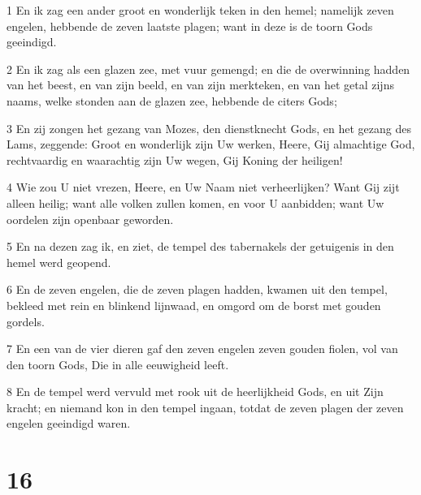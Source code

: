 \par 1 En ik zag een ander groot en wonderlijk teken in den hemel; namelijk zeven engelen, hebbende de zeven laatste plagen; want in deze is de toorn Gods geeindigd.
\par 2 En ik zag als een glazen zee, met vuur gemengd; en die de overwinning hadden van het beest, en van zijn beeld, en van zijn merkteken, en van het getal zijns naams, welke stonden aan de glazen zee, hebbende de citers Gods;
\par 3 En zij zongen het gezang van Mozes, den dienstknecht Gods, en het gezang des Lams, zeggende: Groot en wonderlijk zijn Uw werken, Heere, Gij almachtige God, rechtvaardig en waarachtig zijn Uw wegen, Gij Koning der heiligen!
\par 4 Wie zou U niet vrezen, Heere, en Uw Naam niet verheerlijken? Want Gij zijt alleen heilig; want alle volken zullen komen, en voor U aanbidden; want Uw oordelen zijn openbaar geworden.
\par 5 En na dezen zag ik, en ziet, de tempel des tabernakels der getuigenis in den hemel werd geopend.
\par 6 En de zeven engelen, die de zeven plagen hadden, kwamen uit den tempel, bekleed met rein en blinkend lijnwaad, en omgord om de borst met gouden gordels.
\par 7 En een van de vier dieren gaf den zeven engelen zeven gouden fiolen, vol van den toorn Gods, Die in alle eeuwigheid leeft.
\par 8 En de tempel werd vervuld met rook uit de heerlijkheid Gods, en uit Zijn kracht; en niemand kon in den tempel ingaan, totdat de zeven plagen der zeven engelen geeindigd waren.

\chapter{16}

